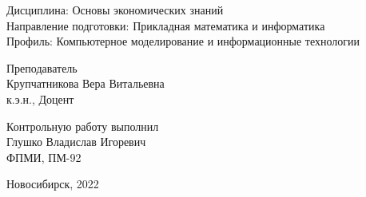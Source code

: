 \documentclass[12pt,a4paper]{article}
\begin{document}
\begin{minipage}{0.15 \textwidth}
\end{minipage}%
\hfill
\begin{minipage}{0.85 \textwidth}
	Дисциплина: Основы экономических знаний \\

	Направление подготовки: Прикладная математика и информатика \\

	Профиль: Компьютерное моделирование и информационные технологии \\

	\vspace{20mm}

	\begin{minipage}{0.5 \textwidth}
		Преподаватель \\

		Крупчатникова Вера Витальевна \\

		к.э.н., Доцент \\
	\end{minipage}%
	\hfill
	\begin{minipage}{0.5 \textwidth}
		Контрольную работу выполнил \\

		Глушко Владислав Игоревич \\

		ФПМИ, ПМ-92 \\
	\end{minipage}%

\end{minipage}%

\vspace{46mm}

\begin{center}
	Новосибирск, 2022
\end{center}

\newpage
\clearpage
\restoregeometry
\end{document}
